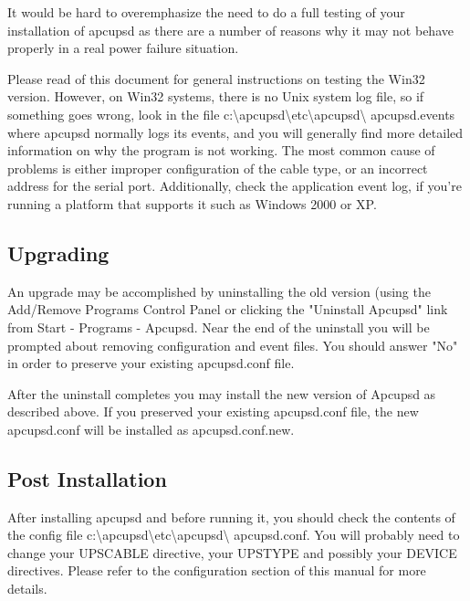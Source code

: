 {{{{{{{\label{index-Windows_002c-Testing-173}
\label{index-Testing_002c-Windows-174}
It would be hard to overemphasize the need to do a full testing of your
installation of apcupsd as there are a number of reasons why it may not behave
properly in a real power failure situation.  

Please read 
 of this document for
general instructions on testing the Win32 version. However, on Win32 systems,
there is no Unix system log file, so if something goes wrong, look in the file
c:\textbackslash{}apcupsd\textbackslash{}etc\textbackslash{}apcupsd\textbackslash
{}apcupsd.events where apcupsd normally logs its events, and you will
generally find more detailed information on why the program is not working.
The most common cause of problems is either improper configuration of the
cable type, or an incorrect address for the serial port. Additionally, check
the application event log, if you're running a platform that supports it such
as Windows 2000 or XP.

\label{Upgrading}
\subsection*{Upgrading}

An upgrade may be accomplished by uninstalling the old version (using
the Add/Remove Programs Control Panel or clicking the "Uninstall Apcupsd" 
link from Start -\gt{} Programs -\gt{} Apcupsd. Near the end of the
uninstall you will be prompted about removing configuration and event
files. You should answer "No" in order to preserve your existing
apcupsd.conf file.

After the uninstall completes you may install the new version of
Apcupsd as described above. If you preserved your existing apcupsd.conf
file, the new apcupsd.conf will be installed as apcupsd.conf.new.

\label{Post-Installation}
\subsection*{Post Installation}

\label{index-Windows_002c-Post-Installation-177}
After installing apcupsd and before running it, you should check the contents
of the config file
c:\textbackslash{}apcupsd\textbackslash{}etc\textbackslash{}apcupsd\textbackslash
{}apcupsd.conf. You will probably need to change your UPSCABLE directive, your
UPSTYPE and possibly your DEVICE directives. Please refer to the configuration
section of this manual for more details.  

}}}}}}}
